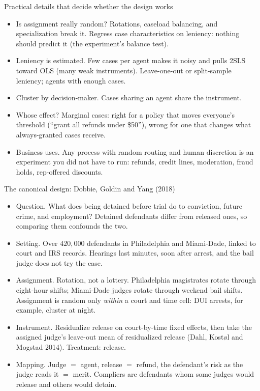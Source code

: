 \documentclass[aspectratio=169,11pt]{beamer}
\begin{document}
\begin{frame}{Practical details that decide whether the design works}
\begin{itemize}
	\item \alert{Is assignment really random?} Rotations, caseload balancing, and specialization break it.
	Regress case characteristics on leniency: nothing should predict it (the experiment's balance test).
	\item \alert{Leniency is estimated.} Few cases per agent makes it noisy and pulls 2SLS toward OLS (many
	weak instruments). Leave-one-out or split-sample leniency; agents with enough cases.
	\item \alert{Cluster by decision-maker.} Cases sharing an agent share the instrument.
	\item \alert{Whose effect?} Marginal cases: right for a policy that moves everyone's threshold (``grant all
	refunds under \$50''), wrong for one that changes what always-granted cases receive.
	\item \alert{Business uses.} Any process with random routing and human discretion is an experiment you
	did not have to run: refunds, credit lines, moderation, fraud holds, rep-offered discounts.
\end{itemize}
\end{frame}


\begin{frame}{The canonical design: Dobbie, Goldin and Yang (2018)}
\begin{itemize}
	\item \alert{Question.} What does being detained before trial do to conviction, future crime, and
	employment? Detained defendants differ from released ones, so comparing them confounds the two.
	\item \alert{Setting.} Over $420{,}000$ defendants in Philadelphia and Miami-Dade, linked to court and IRS
	records. Hearings last minutes, soon after arrest, and the bail judge does not try the case.
	\item \alert{Assignment.} Rotation, not a lottery. Philadelphia magistrates rotate through eight-hour shifts;
	Miami-Dade judges rotate through weekend bail shifts. Assignment is random only \emph{within} a court and
	time cell: DUI arrests, for example, cluster at night.
	\item \alert{Instrument.} Residualize release on court-by-time fixed effects, then take the assigned judge's
	leave-out mean of residualized release (Dahl, Kost\o{}l and Mogstad 2014). Treatment: release.
	\item \alert{Mapping.} Judge $=$ agent, release $=$ refund, the defendant's risk as the judge reads it
	$=$ merit. Compliers are defendants whom some judges would release and others would detain.
\end{itemize}
\end{frame}
\end{document}
